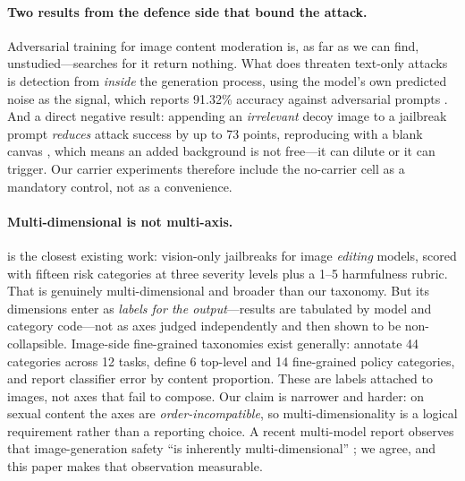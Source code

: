 \documentclass[11pt]{article}
\begin{document}
\paragraph{Two results from the defence side that bound the attack.}
Adversarial training for image content moderation is, as far as we can find,
unstudied---searches for it return nothing. What does threaten text-only
attacks is detection from \emph{inside} the generation process, using the
model's own predicted noise as the signal, which reports 91.32\% accuracy
against adversarial prompts \citep{igndetector,unindm}. And a direct negative
result: appending an \emph{irrelevant} decoy image to a jailbreak prompt
\emph{reduces} attack success by up to 73 points, reproducing with a blank
canvas \citep{decoydrops}, which means an added background is not free---it can
dilute or it can trigger. Our carrier experiments therefore include the
no-carrier cell as a mandatory control, not as a convenience.

\paragraph{Multi-dimensional is not multi-axis.} \citet{visualjailbreak} is
the closest existing work: vision-only jailbreaks for image \emph{editing}
models, scored with fifteen risk categories at three severity levels plus a
1--5 harmfulness rubric. That is genuinely multi-dimensional and broader than
our taxonomy. But its dimensions enter as \emph{labels for the output}---results
are tabulated by model and category code---not as axes judged independently and
then shown to be non-collapsible. Image-side fine-grained taxonomies exist
generally: \citet{t2isafety} annotate 44 categories across 12 tasks,
\citet{t2irisky} define 6 top-level and 14 fine-grained policy categories, and
\citet{redteamingnsfw} report classifier error by content proportion. These are
labels attached to images, not axes that fail to compose. Our claim is narrower
and harder: on sexual content the axes are \emph{order-incompatible}, so
multi-dimensionality is a logical requirement rather than a reporting choice. A
recent multi-model report observes that image-generation safety ``is inherently
multi-dimensional'' \citep{safetyreport}; we agree, and this paper makes that
observation measurable.
\end{document}
